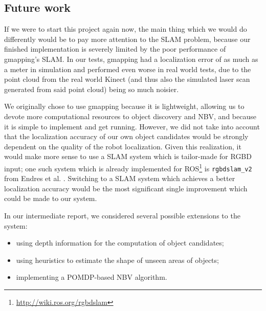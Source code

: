 




\subsection{Future work}

If we were to start this project again now, the main thing which we would do differently would be to pay more attention to the SLAM problem, because our finished implementation is severely limited by the poor performance of gmapping's SLAM.
In our tests, gmapping had a localization error of as much as a meter in simulation and performed even worse in real world tests, due to the point cloud from the real world Kinect (and thus also the simulated laser scan generated from said point cloud) being so much noisier.

We originally chose to use gmapping because it is lightweight, allowing us to devote more computational resources to object discovery and NBV, and because it is simple to implement and get running.
However, we did not take into account that the localization accuracy of our own object candidates would be strongly dependent on the quality of the robot localization.
Given this realization, it would make more sense to use a SLAM system which is tailor-made for RGBD input; one such system which is already implemented for ROS\footnote{\url{http://wiki.ros.org/rgbdslam}} is \texttt{rgbdslam\_v2} from Endres et al. \cite{endres2014rgbdslam}.
Switching to a SLAM system which achieves a better localization accuracy would be the most significant single improvement which could be made to our system.

In our intermediate report, we considered several possible extensions to the system:
\begin{itemize}
	\setlength\itemsep{1pt}
	\item using depth information for the computation of object candidates;
	\item using heuristics to estimate the shape of unseen areas of objects;
	\item implementing a POMDP-based NBV algorithm.
\end{itemize}

